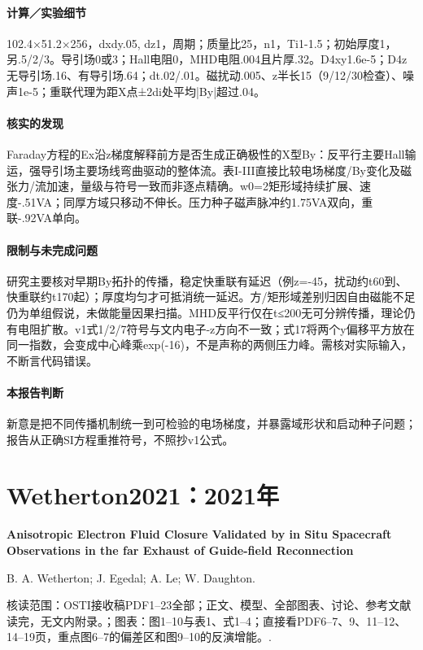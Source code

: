 \paragraph{计算／实验细节}102.4×51.2×256，dxdy.05, dz1，周期；质量比25，n1，Ti1-1.5；初始厚度1，另.5/2/3。导引场0或3；Hall电阻0，MHD电阻.004且片厚.32。D4xy1.6e-5；D4z无导引场.16、有导引场.64；dt.02/.01。磁扰动.005、z半长15（9/12/30检查）、噪声1e-5；重联代理为距X点±2di处平均|By|超过.04。

\paragraph{核实的发现}Faraday方程的Ex沿z梯度解释前方是否生成正确极性的X型By：反平行主要Hall输运，强导引场主要场线弯曲驱动的整体流。表I-III直接比较电场梯度/By变化及磁张力/流加速，量级与符号一致而非逐点精确。w0=2矩形域持续扩展、速度-.51VA；同厚方域只移动不伸长。压力种子磁声脉冲约1.75VA双向，重联-.92VA单向。

\paragraph{限制与未完成问题}研究主要核对早期By拓扑的传播，稳定快重联有延迟（例z=-45，扰动约t60到、快重联约t170起）；厚度均匀才可抵消统一延迟。方/矩形域差别归因自由磁能不足仍为单组假说，未做能量因果扫描。MHD反平行仅在t≤200无可分辨传播，理论仍有电阻扩散。v1式1/2/7符号与文内电子-z方向不一致；式17将两个y偏移平方放在同一指数，会变成中心峰乘exp(-16)，不是声称的两侧压力峰。需核对实际输入，不断言代码错误。

\paragraph{本报告判断}新意是把不同传播机制统一到可检验的电场梯度，并暴露域形状和启动种子问题；报告从正确SI方程重推符号，不照抄v1公式。

\section{Wetherton2021：2021年}\label{paper:Wetherton2021}

\textbf{Anisotropic Electron Fluid Closure Validated by in Situ Spacecraft Observations in the far Exhaust of Guide-field Reconnection}\citep{Wetherton2021}\

B. A. Wetherton;  J. Egedal;  A. Le;  W. Daughton.

\textsf{核读范围：}OSTI接收稿PDF1–23全部；正文、模型、全部图表、讨论、参考文献读完，无文内附录。；\textsf{图表：}图1–10与表1、式1–4；直接看PDF6–7、9、11–12、14–19页，重点图6–7的偏差区和图9–10的反演增能。.

